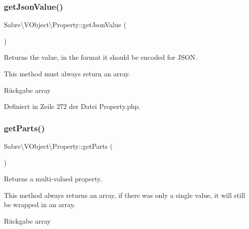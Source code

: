 \mbox{\label{class_sabre_1_1_v_object_1_1_property_aa1ac2fdc4e178a3a12076751640ffa57}} 
\subsubsection{\texorpdfstring{get\+Json\+Value()}{getJsonValue()}}
{\footnotesize\ttfamily Sabre\textbackslash{}\+V\+Object\textbackslash{}\+Property\+::get\+Json\+Value (\begin{DoxyParamCaption}{ }\end{DoxyParamCaption})}

Returns the value, in the format it should be encoded for J\+S\+ON.

This method must always return an array.

\begin{DoxyReturn}{Rückgabe}
array 
\end{DoxyReturn}


Definiert in Zeile 272 der Datei Property.\+php.

\mbox{\label{class_sabre_1_1_v_object_1_1_property_a1e2e0bf97c73b44b3f5337429abcfe73}} 
\subsubsection{\texorpdfstring{get\+Parts()}{getParts()}}
{\footnotesize\ttfamily Sabre\textbackslash{}\+V\+Object\textbackslash{}\+Property\+::get\+Parts (\begin{DoxyParamCaption}{ }\end{DoxyParamCaption})}

Returns a multi-\/valued property.

This method always returns an array, if there was only a single value, it will still be wrapped in an array.

\begin{DoxyReturn}{Rückgabe}
array 
\end{DoxyReturn}



